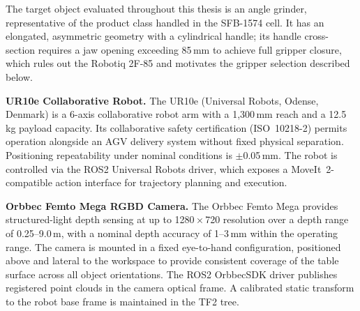 \documentclass[oneside,studentpaper]{wbk}
\begin{document}
The target object evaluated throughout this thesis is an angle grinder, representative of the product class handled in the SFB-1574 cell. It has an elongated, asymmetric geometry with a cylindrical handle; its handle cross-section requires a jaw opening exceeding 85\,mm to achieve full gripper closure, which rules out the Robotiq 2F-85 and motivates the gripper selection described below.


\textbf{UR10e Collaborative Robot.} The UR10e (Universal Robots, Odense, Denmark) is a 6-axis collaborative robot arm with a 1,300\,mm reach and a 12.5\,kg payload capacity. Its collaborative safety certification (ISO~10218-2) permits operation alongside an AGV delivery system without fixed physical separation. Positioning repeatability under nominal conditions is $\pm$0.05\,mm. The robot is controlled via the ROS2 Universal Robots driver, which exposes a MoveIt~2-compatible action interface for trajectory planning and execution. 


\textbf{Orbbec Femto Mega RGBD Camera.} The Orbbec Femto Mega provides structured-light depth sensing at up to 1280\,$\times$\,720 resolution over a depth range of 0.25--9.0\,m, with a nominal depth accuracy of 1--3\,mm within the operating range. The camera is mounted in a fixed eye-to-hand configuration, positioned above and lateral to the workspace to provide consistent coverage of the table surface across all object orientations. The ROS2 OrbbecSDK driver publishes registered point clouds in the camera optical frame. A calibrated static transform to the robot base frame is maintained in the TF2 tree. 

\end{document}
